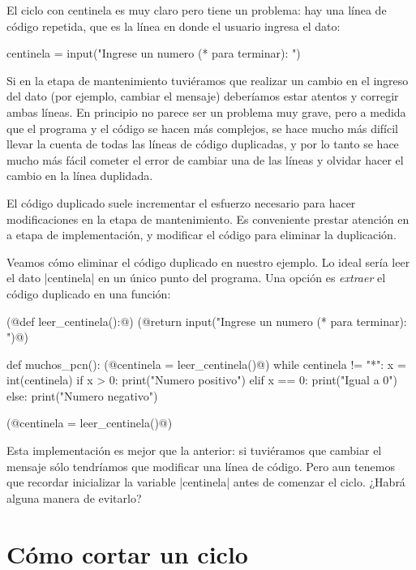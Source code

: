 El ciclo con centinela es muy claro pero tiene un problema: hay una línea de
código repetida, que es la línea en donde el usuario ingresa el dato:

\begin{codigo-python-sn}
centinela = input("Ingrese un numero (* para terminar): ")
\end{codigo-python-sn}

Si en la etapa de mantenimiento tuviéramos que realizar un
cambio en el ingreso del dato (por ejemplo, cambiar el mensaje) deberíamos
estar atentos y corregir ambas líneas. En principio no parece ser un problema
muy grave, pero a medida que el programa y el código se hacen más complejos,
se hace mucho más difícil llevar la cuenta de todas las líneas de código
duplicadas, y por lo tanto se hace mucho más fácil cometer el error de cambiar
una de las líneas y olvidar hacer el cambio en la línea duplidada.

\begin{observacion}
El código duplicado suele incrementar el esfuerzo necesario para hacer
modificaciones en la etapa de mantenimiento. Es conveniente prestar atención en
a etapa de implementación, y modificar el código para eliminar la duplicación.
\end{observacion}

Veamos cómo eliminar el código duplicado en nuestro ejemplo.
Lo ideal sería leer el dato |centinela| en un único punto del
programa. Una opción es {\it extraer} el código duplicado en una función:

\begin{codigo-python-sn}
(@def leer_centinela():@)
    (@return input("Ingrese un numero (* para terminar): ")@)

def muchos_pcn():
    (@centinela = leer_centinela()@)
    while centinela != "*":
        x = int(centinela)
        if x > 0:
            print("Numero positivo")
        elif x == 0:
            print("Igual a 0")
        else:
            print("Numero negativo")

        (@centinela = leer_centinela()@)
\end{codigo-python-sn}

Esta implementación es mejor que la anterior: si tuviéramos que cambiar el
mensaje sólo tendríamos que modificar una línea de código. Pero aun tenemos que
recordar inicializar la variable |centinela| antes de comenzar el ciclo. ¿Habrá
alguna manera de evitarlo?

\section{Cómo cortar un ciclo}

